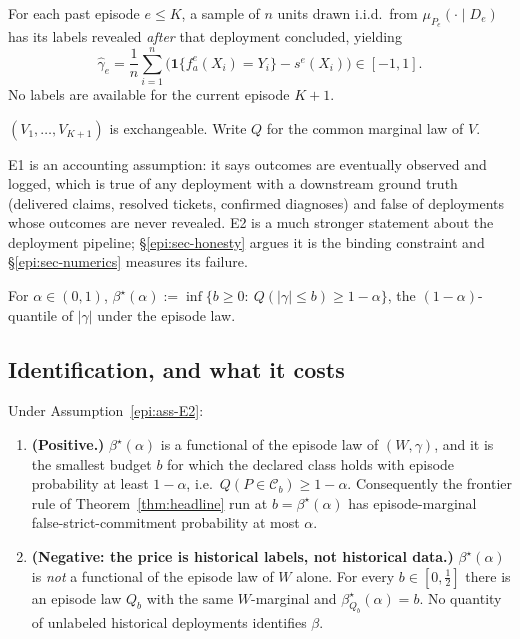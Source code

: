 \begin{assumption}\label{epi:ass-E1}
For each past episode $e\le K$, a sample of $n$ units drawn i.i.d.\ from $\mu_{P_e}(\cdot\mid D_e)$
has its labels revealed \emph{after} that deployment concluded, yielding
\[
\widehat\gamma_e=\frac1n\sum_{i=1}^{n}\bigl(\mathbf 1\{f_a^e(X_i)=Y_i\}-s^e(X_i)\bigr)\in[-1,1].
\]
No labels are available for the current episode $K+1$.
\end{assumption}

\begin{assumption}\label{epi:ass-E2}
$(V_1,\dots,V_{K+1})$ is exchangeable. Write $Q$ for the common marginal law of $V$.
\end{assumption}

E1 is an accounting assumption: it says outcomes are eventually observed and logged, which is true
of any deployment with a downstream ground truth (delivered claims, resolved tickets, confirmed
diagnoses) and false of deployments whose outcomes are never revealed. E2 is a much stronger
statement about the deployment pipeline; \S\ref{epi:sec-honesty} argues it is the binding constraint
and \S\ref{epi:sec-numerics} measures its failure.

\begin{definition}\label{epi:def-beta-star}
For $\alpha\in(0,1)$, $\beta^\star(\alpha):=\inf\{b\ge0:\ Q(|\gamma|\le b)\ge1-\alpha\}$, the
$(1-\alpha)$-quantile of $|\gamma|$ under the episode law.
\end{definition}

\subsection{Identification, and what it costs}

\begin{theorem}\label{epi:thm-ident}
Under Assumption~\ref{epi:ass-E2}:
\begin{enumerate}
\item[\textnormal{(a)}] \textbf{(Positive.)} $\beta^\star(\alpha)$ is a functional of the episode law
of $(W,\gamma)$, and it is the smallest budget $b$ for which the declared class holds with episode
probability at least $1-\alpha$, i.e.\ $Q(P\in\mathcal C_b)\ge1-\alpha$. Consequently the frontier
rule of Theorem~\ref{thm:headline} run at $b=\beta^\star(\alpha)$ has episode-marginal
false-strict-commitment probability at most $\alpha$.
\item[\textnormal{(b)}] \textbf{(Negative: the price is historical labels, not historical data.)}
$\beta^\star(\alpha)$ is \emph{not} a functional of the episode law of $W$ alone. For every
$b\in[0,\tfrac12]$ there is an episode law $Q_b$ with the same $W$-marginal and
$\beta^\star_{Q_b}(\alpha)=b$. No quantity of unlabeled historical deployments identifies $\beta$.
\end{enumerate}
\end{theorem}

